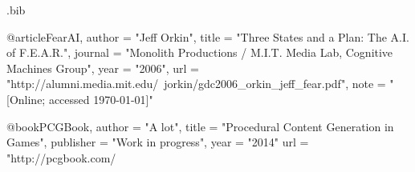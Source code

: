 \begin{filecontents*}{\jobname.bib}

@article{FearAI,
	author	= "Jeff Orkin",
	title		= "Three States and a Plan: The A.I. of F.E.A.R.",
	journal	= "Monolith Productions / M.I.T. Media Lab, Cognitive Machines Group",
	year		= "2006",
	url 		= "http://alumni.media.mit.edu/~jorkin/gdc2006\_orkin\_jeff\_fear.pdf",
	note		= "[Online; accessed \today]"
}

@book{PCGBook,
	author 	= "A lot",
	title 		= "Procedural Content Generation in Games",
	publisher 	= "Work in progress",
	year 		= "2014"
	url 		= "http://pcgbook.com/
}

\end{filecontents*}

